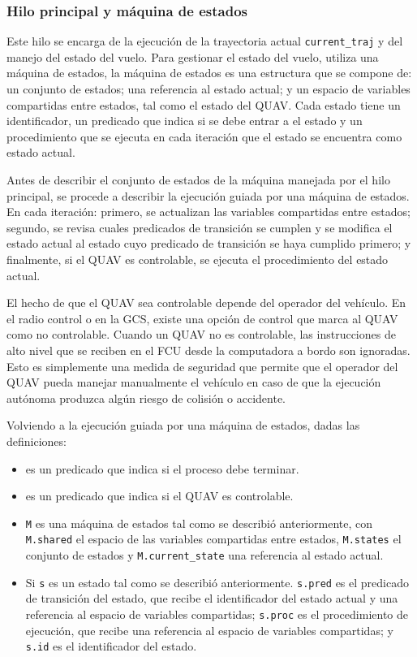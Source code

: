 \subsubsection{Hilo principal y máquina de estados}

Este hilo se encarga de la ejecución de la trayectoria actual \texttt{current\_traj} y del manejo del estado del vuelo. Para gestionar el estado del vuelo, utiliza una máquina de estados, la máquina de estados es una estructura que se compone de: un conjunto de estados; una referencia al estado actual; y un espacio de variables compartidas entre estados, tal como el estado del QUAV. Cada estado tiene un identificador, un predicado que indica si se debe entrar a el estado y un procedimiento que se ejecuta en cada iteración que el estado se encuentra como estado actual.

Antes de describir el conjunto de estados de la máquina manejada por el hilo principal, se procede a describir la ejecución guiada por una máquina de estados. En cada iteración: primero, se actualizan las variables compartidas entre estados; segundo, se revisa cuales predicados de transición se cumplen y se modifica el estado actual al estado cuyo predicado de transición se haya cumplido primero; y finalmente, si el QUAV es controlable, se ejecuta el procedimiento del estado actual. 

El hecho de que el QUAV sea controlable depende del operador del vehículo. En el radio control o en la GCS, existe una opción de control que marca al QUAV como no controlable. Cuando un QUAV no es controlable, las instrucciones de alto nivel que se reciben en el FCU desde la computadora a bordo son ignoradas. Esto es simplemente una medida de seguridad que permite que el operador del QUAV pueda manejar manualmente el vehículo en caso de que la ejecución autónoma produzca algún riesgo de colisión o accidente.

Volviendo a la ejecución guiada por una máquina de estados, dadas las definiciones:

\begin{itemize}
    \item {} es un predicado que indica si el proceso debe terminar.
    \item {} es un predicado que indica si el QUAV es controlable.
    \item \texttt{M} es una máquina de estados tal como se describió anteriormente, con \texttt{M.shared} el espacio de las variables compartidas entre estados, \texttt{M.states} el conjunto de estados y \texttt{M.current\_state} una referencia al estado actual.
    \item Si \texttt{s} es un estado tal como se describió anteriormente. \texttt{s.pred} es el predicado de transición del estado, que recibe el identificador del estado actual y una referencia al espacio de variables compartidas; \texttt{s.proc} es el procedimiento de ejecución, que recibe una referencia al espacio de variables compartidas; y \texttt{s.id} es el identificador del estado.
\end{itemize}

